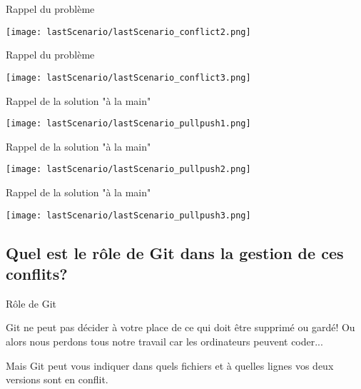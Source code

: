 \documentclass{beamer}
\begin{document}
\begin{frame}{Rappel du problème}
\begin{center}
    \texttt{[image: lastScenario/lastScenario\_conflict2.png]}
\end{center}
\end{frame}

\begin{frame}{Rappel du problème}
\begin{center}
    \texttt{[image: lastScenario/lastScenario\_conflict3.png]}
\end{center}
\end{frame}

\begin{frame}{Rappel de la solution "à la main"}
\begin{center}
    \texttt{[image: lastScenario/lastScenario\_pullpush1.png]}
\end{center}
\end{frame}

\begin{frame}{Rappel de la solution "à la main"}
\begin{center}
    \texttt{[image: lastScenario/lastScenario\_pullpush2.png]}
\end{center}
\end{frame}

\begin{frame}{Rappel de la solution "à la main"}
\begin{center}
    \texttt{[image: lastScenario/lastScenario\_pullpush3.png]}
\end{center}
\end{frame}


\subsection{Quel est le rôle de Git dans la gestion de ces conflits?}
\begin{frame}{Rôle de Git}

Git ne peut pas décider à votre place de ce qui doit être supprimé ou gardé! Ou alors nous perdons tous notre travail car les ordinateurs peuvent coder...\\
\medskip

Mais Git peut vous indiquer dans quels fichiers et à quelles lignes vos deux versions sont en conflit. 
    
\end{frame}
\end{document}
